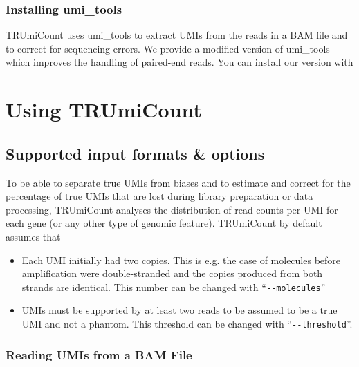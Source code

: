 \documentclass[10pt]{article}
\newcommand{\ddarg}[1]{\texttt{-{}-#1}}
\begin{document}
\subsubsection*{Installing umi\_tools}

TRUmiCount uses umi\_tools to extract UMIs from the reads in a BAM file and to correct for sequencing errors. We provide a modified version of umi\_tools which improves the handling of paired-end reads. You can install our version with


\pagebreak
\section{Using TRUmiCount}

\subsection{Supported input formats \& options}

To be able to separate true UMIs from biases and to estimate and correct for the percentage of true UMIs that are lost during library preparation or data processing, TRUmiCount analyses the distribution of read counts per UMI for each gene (or any other type of genomic feature). TRUmiCount by default assumes that

\begin{itemize}
  \item Each UMI initially had two copies. This is e.g. the case of molecules before amplification were double-stranded and the copies produced from both strands are identical. This number can be changed with ``\ddarg{molecules}''
  \item UMIs must be supported by at least two reads to be assumed to be a true UMI and not a phantom. This threshold can be changed with ``\ddarg{threshold}''.
\end{itemize}

\subsubsection*{Reading UMIs from a BAM File}
\end{document}
